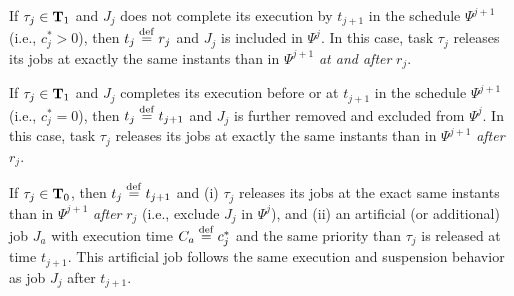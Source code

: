  If $\tau_j \in {\bf T}_1$ and $J_{j}$ does not complete its execution by $t_{j+1}$ in the schedule $\Psi^{j+1}$ (i.e., $c_j^*>0$), then $t_j \stackrel{\mathrm{def}}{=} r_j$ and $J_j$ is included in $\Psi^j$. In this case, task $\tau_j$ releases its jobs at exactly the same instants than in $\Psi^{j+1}$ \emph{at and after} $r_j$.

 If $\tau_j \in {\bf T}_1$ and $J_{j}$ completes its execution before or at $t_{j+1}$ in the schedule $\Psi^{j+1}$ (i.e., $c_j^* = 0$), then $t_j \stackrel{\mathrm{def}}{=} t_{j+1}$ and $J_j$ is further removed and excluded from $\Psi^j$. In this case, task 
 $\tau_j$ releases its jobs at exactly the same instants than in $\Psi^{j+1}$ \emph{after} $r_j$.

 If $\tau_j \in {\bf T}_0$, then $t_j \stackrel{\mathrm{def}}{=} t_{j+1}$ and (i) $\tau_j$ releases its jobs at the exact same instants than in $\Psi^{j+1}$ \emph{after} $r_j$ (i.e., exclude $J_j$ in $\Psi^j$), and (ii) an artificial (or additional) job $J_a$ with execution time $C_a \stackrel{\mathrm{def}}{=} c_j^*$ and the same priority than $\tau_j$ is released at time $t_{j+1}$. This artificial job follows the same execution and suspension behavior as job $J_j$ after $t_{j+1}$.


